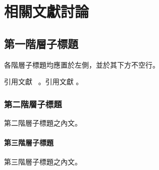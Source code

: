 \chapter{相關文獻討論}
\label{c:2}

\section{第一階層子標題}

各階層子標題均應置於左側，並於其下方不空行。


引用文獻  ~\cite{Parker:2013}。引用文獻 \cite{Hsiao:2018}。


\subsection{第二階層子標題}

第二階層子標題之內文。

\subsubsection{第三階層子標題}

第三階層子標題之內文。




